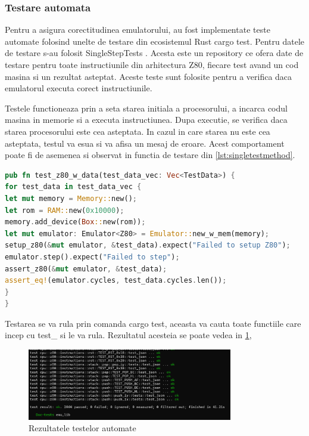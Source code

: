 \documentclass[titlepage,12pt]{article}
\DeclareRobustCommand{\code}[1]{{\ttfamily\small #1}}
\begin{document}
\subsubsection{Testare automata}

Pentru a asigura corectitudinea emulatorului, au fost implementate teste automate folosind unelte de testare din ecosistemul Rust \code {cargo test}.
Pentru datele de testare s-au folosit SingleStepTests \cite {ref:singlesteptestsz80}. Acesta este un repository ce ofera date de testare pentru toate instructiunile din arhitectura Z80, fiecare test avand un cod masina si un rezultat asteptat. Aceste teste sunt folosite pentru a verifica daca emulatorul executa corect instructiunile.

Testele functioneaza prin a seta starea initiala a procesorului, a incarca codul masina in memorie si a executa instructiunea. Dupa executie, se verifica daca starea procesorului este cea asteptata. In cazul in care starea nu este cea asteptata, testul va esua si va afisa un mesaj de eroare. Acest comportament poate fi de asemenea si observat in functia de testare din \ref {lst:singletestmethod}.

\begin{lstlisting}[language=Rust,caption={Metoda de testare a unei singure instructiuni},label={lst:singletestmethod}]
pub fn test_z80_w_data(test_data_vec: Vec<TestData>) {
for test_data in test_data_vec {
let mut memory = Memory::new();
let rom = RAM::new(0x10000);
memory.add_device(Box::new(rom));
let mut emulator: Emulator<Z80> = Emulator::new_w_mem(memory);
setup_z80(&mut emulator, &test_data).expect("Failed to setup Z80");
emulator.step().expect("Failed to step");
assert_z80(&mut emulator, &test_data);
assert_eq!(emulator.cycles, test_data.cycles.len());
}
}
\end{lstlisting}

Testarea se va rula prin comanda \code{cargo test}, aceasta va cauta toate functiile care incep cu \code{test\_} si le va rula. Rezultatul acesteia se poate vedea in \cref{fig:testresults},

\begin{figure}[h!]
\centering
\includegraphics[width=0.8\textwidth]{images/testresults.png}
\caption{Rezultatele testelor automate}
\label{fig:testresults}
\end{figure}
\end{document}
